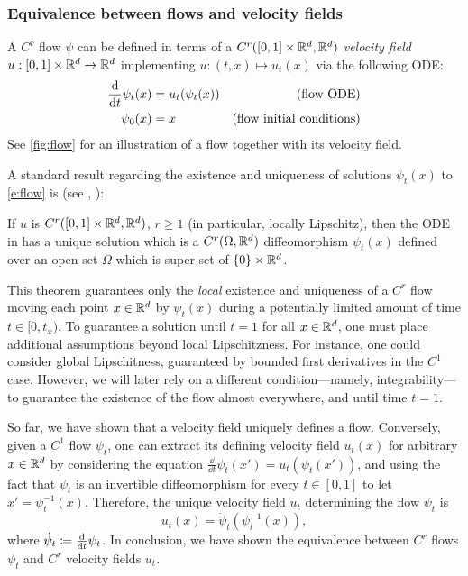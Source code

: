 \documentclass{fairmeta}
\renewcommand{\eqref}[1]{\labelcref{#1}}
\numberwithin{equation}{section}
\begin{document}
\subsubsection{Equivalence between flows and velocity fields}\label{sec:equivalence_flows_velocities}
A $C^r$ flow $\psi$ can be defined in terms of a $C^r([0,1]\times \mathbb R^d,\mathbb R^d)$ \emph{velocity field} $u:[0,1]\times \mathbb R^d \rightarrow \mathbb R^d$ implementing $u : (t, x) \mapsto u_t(x)$ via the following ODE:
\begin{subequations}\label{e:flow}\vspace{-10pt}
    \begin{align} 
      \frac{\dd}{\dd t}\psi_{t}(x) &= u_t(\psi_{t}(x)) & \text{(flow ODE)}\label{e:flow_flow}\\
      \psi_{0}(x)             &= x                & \text{(flow initial conditions)}\label{e:flow_boundary} 
    \end{align}
\end{subequations}    
See \cref{fig:flow} for an illustration of a flow together with its velocity field.

A standard result regarding the existence and uniqueness of solutions $\psi_t(x)$ to \cref{e:flow} is (see \eg, \cite{perko2013differential,coddington1956theory}): 
\begin{myframe}
    \begin{theorem}\label{thm:ode_existence_and_uniqueness}
    If $u$ is $C^r([0,1]\times\mathbb R^{d},\mathbb R^d)$, $r\geq 1$ (in particular, locally Lipschitz), then the ODE in \eqref{e:flow} has a unique solution which is a  $C^r(\Omega,\mathbb R^d)$ diffeomorphism $\psi_t(x)$ defined over an open set $\Omega$ which is super-set of $\left\{0\right\}\times \mathbb R^d$.
    \end{theorem}
\end{myframe}
This theorem guarantees only the \emph{local} existence and uniqueness of a $C^r$ flow moving each point $x\in\mathbb R^d$ by $\psi_t(x)$ during a potentially limited amount of time $t\in[0,t_x)$.
To guarantee a solution until $t=1$ for all $x\in\mathbb R^d$, one must place additional assumptions beyond local Lipschitzness.
For instance, one could consider global Lipschitness, guaranteed by bounded first derivatives in the $C^1$ case.
However, we will later rely on a different condition---namely, integrability---to guarantee the existence of the flow almost everywhere, and until time $t=1$.


So far, we have shown that a velocity field uniquely defines a flow.
Conversely, given a $C^1$ flow $\psi_t$, one can extract its defining velocity field $u_t(x)$ for arbitrary $x \in \mathbb R^d$ by considering the equation $\frac{\dd}{\dd t} \psi_t(x') = u_t(\psi_t(x'))$, and using the fact that $\psi_t$ is an invertible diffeomorphism for every $t \in [0, 1]$ to let $x'=\psi^{-1}_t(x)$.
Therefore, the unique velocity field $u_t$ determining the flow $\psi_t$ is
\begin{equation}\label{e:u_from_psi}
    u_t(x) = \dot{\psi}_t( \psi^{-1}_t(x)),
\end{equation}
where $\dot{\psi}_t\coloneqq \frac{\mathrm{d}}{\mathrm{d} t} \psi_t$.
In conclusion, we have shown the equivalence between $C^r$ flows $\psi_t$ and $C^r$ velocity fields $u_t$.
\end{document}
